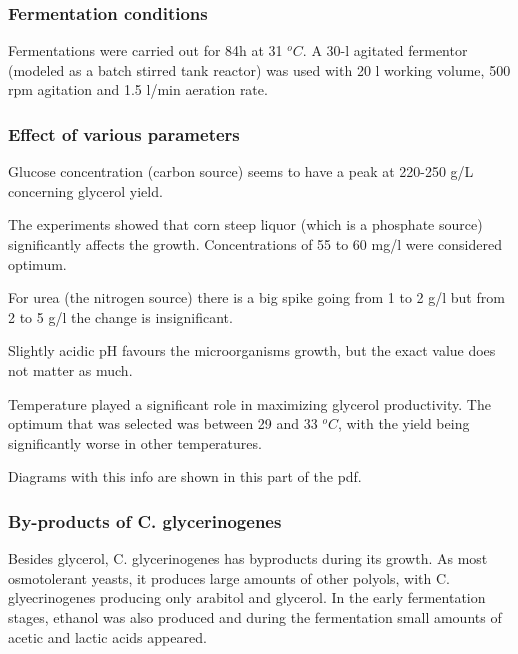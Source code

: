 \documentclass[11pt]{article}
\begin{document}
\subsubsection{Fermentation conditions}
\label{sec:orgb59280d}
Fermentations were carried out for 84h at 31 \(^oC\). A 30-l agitated fermentor (modeled as a batch stirred tank reactor) was used with 20 l working volume, 500 rpm agitation and 1.5 l/min aeration rate.
\subsubsection{Effect of various parameters}
\label{sec:orgc6819c8}
Glucose concentration (carbon source) seems to have a peak at 220-250 g/L concerning glycerol yield.

The experiments showed that corn steep liquor (which is a phosphate source) significantly affects the growth. Concentrations of 55 to 60 mg/l were considered optimum.

For urea (the nitrogen source) there is a big spike going from 1 to 2 g/l but from 2 to 5 g/l the change is insignificant.

Slightly acidic pH favours the microorganisms growth, but the exact value does not matter as much.

Temperature played a significant role in maximizing glycerol productivity. The optimum that was selected was between 29 and 33 \(^oC\), with the yield being significantly worse in other temperatures.

Diagrams with this info are shown in this part of the pdf.
\subsubsection{By-products of C. glycerinogenes}
\label{sec:org28b2412}
Besides glycerol, C. glycerinogenes has byproducts during its growth. As most osmotolerant yeasts, it produces large amounts of other polyols, with C. glyecrinogenes producing only arabitol and glycerol. In the early fermentation stages, ethanol was also produced and during the fermentation small amounts of acetic and lactic acids appeared.
\end{document}
